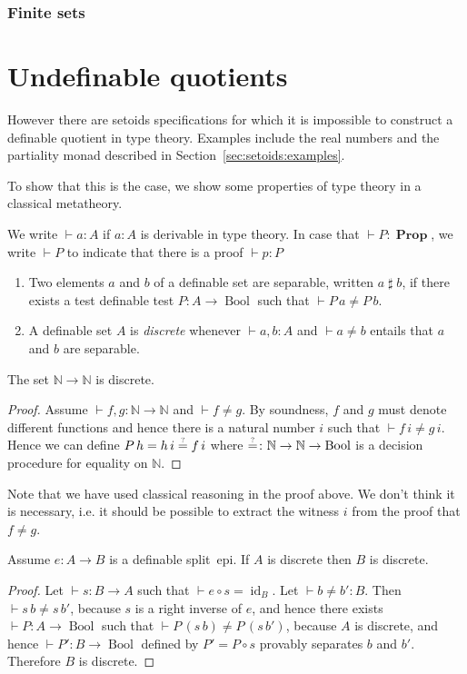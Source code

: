 \documentclass[envcountsame]{llncs}
\newcommand{\N}{\mathbb{N}}
\DeclareMathOperator{\Prop}{\mathbf{Prop}}
\DeclareMathOperator{\Bool}{Bool}
\DeclareMathOperator{\id}{id}
\newcommand{\eqqm}{\overset{\text{\tiny ?}}{=}}
\newcommand{\sep}{\mathrel{\sharp}}
\begin{document}
\subsubsection*{Finite sets}


\section{Undefinable quotients}
However there are setoids specifications for which it is impossible to construct a definable quotient in type theory. Examples include the real numbers and the partiality monad described in Section~\ref{sec:setoids:examples}.

To show that this is the case, we show some properties of type theory in a classical metatheory.

We write $\vdash a\colon A$ if $a\colon A$ is derivable in type theory. In case that $\vdash P\colon \Prop$, we write $\vdash P$ to indicate that there is a proof $\vdash p\colon P$
\begin{definition}\hfill
\begin{enumerate}
\item Two elements $a$ and $b$ of a definable set are separable, written $a \sep b$, if there exists a test definable test $P\colon A\to \Bool$ such that $\vdash P\,a \neq P\,b$. 
\item A definable set $A$ is \emph{discrete} whenever $\vdash a, b\colon A$ and   $\vdash a\not= b$
entails that $a$ and $b$ are separable.
\end{enumerate}
\end{definition}
\begin{proposition}\label{prop:NtoNdiscrete}
The set $\N\to\N$ is discrete. 
\end{proposition}
\begin{proof}
Assume $\vdash f, g\colon \N \to \N$ and $\vdash f\neq g$. By soundness, $f$ and $g$ must denote different functions and hence there is a natural number $i$ such that $\vdash f\,i\neq g\,i$. Hence we can define $P\,h = {h\,i} \eqqm {f\,i}$ where ${\eqqm}\colon \N\to\N\to\Bool$ is a decision procedure for equality on $\N$. 
\end{proof}

Note that we have used classical reasoning in the proof above. We don't think it is necessary, i.e. it should be possible to extract the witness $i$ from the proof that $f\neq g$.

\begin{proposition}\label{prop:splitepidiscrete}
Assume $ e\colon A\to B$ is a definable split~epi.  If $A$ is discrete then $B$ is discrete.
\end{proposition}
\begin{proof}
Let $\vdash s\colon B\to A$ such that $\vdash e\circ s=\id_B$. Let $\vdash b\neq b'\colon B$. Then $\vdash s\,b\neq s\,b'$, because $s$ is a right inverse of $e$, and hence there exists $\vdash P\colon A\to\Bool$ such that $\vdash P\,(s\,b)\neq P\,(s\,b')$, because $A$ is discrete, and hence $\vdash P'\colon B\to\Bool$ defined by $P' = P\circ s$ provably separates $b$ and $b'$.
Therefore $B$ is discrete.
\end{proof}
\end{document}
